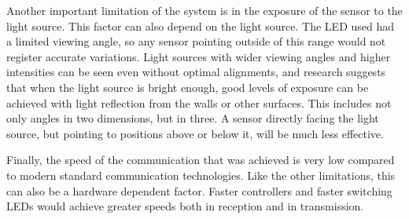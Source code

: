 Another important limitation of the system is in the exposure of the sensor to the light source.
This factor can also depend on the light source.
The LED used had a limited viewing angle, so any sensor pointing outside of this range would not register accurate variations.
Light sources with wider viewing angles and higher intensities can be seen even without optimal alignments, and research suggests that when the light source is bright enough, good levels of exposure can be achieved with light reflection from the walls or other surfaces\cite{interferenceVLC}.
This includes not only angles in two dimensions, but in three. A sensor directly facing the light source, but pointing to positions above or below it, will be much less effective.

Finally, the speed of the communication that was achieved is very low compared to modern standard communication technologies.
Like the other limitations, this can also be a hardware dependent factor.
Faster controllers and faster switching LEDs would achieve greater speeds both in reception and in transmission.

